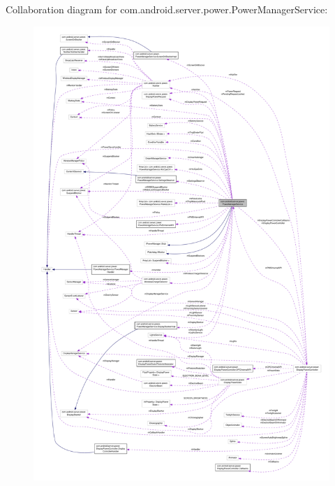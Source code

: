 Collaboration diagram for com.\-android.\-server.\-power.\-Power\-Manager\-Service\-:
\nopagebreak
\begin{figure}[H]
\begin{center}
\leavevmode
\includegraphics[width=350pt]{classcom_1_1android_1_1server_1_1power_1_1PowerManagerService__coll__graph}
\end{center}
\end{figure}
